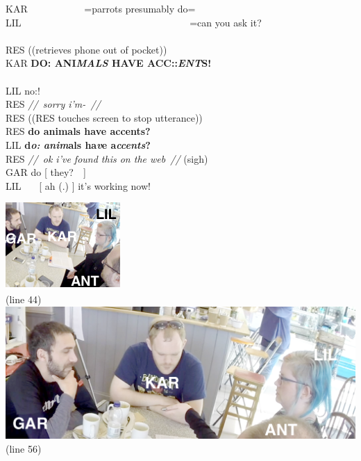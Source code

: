 \begin{inlinefrag}
\begin{transcript}
        \by KAR {~~~~~~~~~~~=parrots presumably do=} \\
        \by LIL {~~~~~~~~~~~~~~~~~~~~~~~~~~~~~~~~~~=can you ask it?} \\
         \\
        \by RES {((retrieves phone out of pocket))} \\
        \by KAR {\textbf{DO: ANI\emph{MALS} HAVE ACC::\emph{ENT}S!}} \\
         \\
        \by LIL {no:!} \\
        \by RES {\textit{//~sorry i'm-~//}} \\
        \by RES {((RES touches screen to stop utterance))} \\
        \by RES {\textbf{do animals have accents?}} \\
        \by LIL {\textbf{d\emph{o:} \emph{anim}als ha\emph{v}e a\emph{ccents}?}} \\
        \by RES {\textit{//~ok i've found this on the web~//} (sigh)} \\
        \by GAR {do [ they?~~]} \\
        \by LIL {~~~[ ah (.) ] it's working now!} \\
    \end{transcript}

    \begin{center}
            \includegraphics[width=.7\linewidth]{Graphics/3-2-Empirical-Cafe/FragmentAnimals-2}\\
            (line 44)\\[1cm]
            \includegraphics[width=.7\linewidth]{Graphics/3-2-Empirical-Cafe/FragmentAnimals-3}\\
            (line 56)
    \end{center}
\end{inlinefrag}

